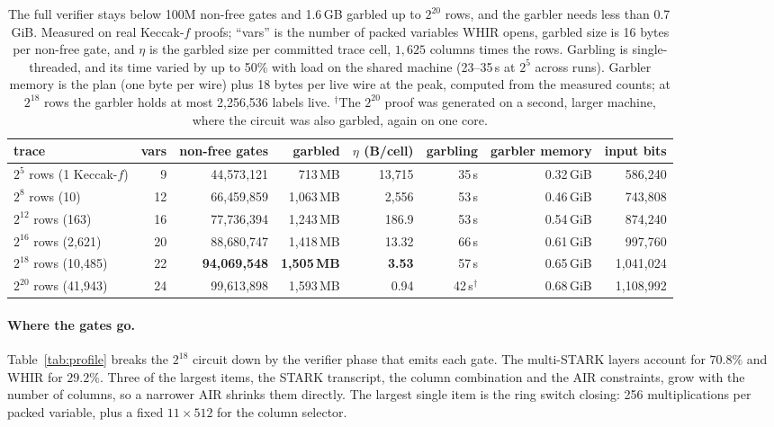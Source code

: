 \documentclass[11pt]{article}
\begin{document}
\begin{table}[t]\centering\footnotesize\setlength{\tabcolsep}{4pt}
\begin{tabular}{lrrrrrrr}\toprule
trace & vars & non-free gates & garbled & $\eta$ (B/cell) & garbling & garbler memory & input bits\\\midrule
$2^5$ rows (1 Keccak-$f$) & 9 & 44{,}573{,}121 & 713\,MB & 13{,}715 & 35\,s & 0.32\,GiB & 586{,}240\\
$2^8$ rows (10) & 12 & 66{,}459{,}859 & 1{,}063\,MB & 2{,}556 & 53\,s & 0.46\,GiB & 743{,}808\\
$2^{12}$ rows (163) & 16 & 77{,}736{,}394 & 1{,}243\,MB & 186.9 & 53\,s & 0.54\,GiB & 874{,}240\\
$2^{16}$ rows (2{,}621) & 20 & 88{,}680{,}747 & 1{,}418\,MB & 13.32 & 66\,s & 0.61\,GiB & 997{,}760\\
$2^{18}$ rows (10{,}485) & 22 & \textbf{94{,}069{,}548} & \textbf{1{,}505\,MB} & \textbf{3.53} & 57\,s & 0.65\,GiB & 1{,}041{,}024\\
$2^{20}$ rows (41{,}943) & 24 & 99{,}613{,}898 & 1{,}593\,MB & 0.94 & 42\,s$^{\dagger}$ & 0.68\,GiB & 1{,}108{,}992\\\bottomrule
\end{tabular}
\caption{The full verifier stays below 100M non-free gates and 1.6\,GB garbled up
to $2^{20}$ rows, and the garbler needs less than 0.7\,GiB. Measured on real
Keccak-$f$ proofs; ``vars'' is the number of packed variables WHIR opens,
garbled size is 16 bytes per non-free gate, and $\eta$ is the garbled size per
committed trace cell, $1{,}625$ columns times the rows. Garbling is single-threaded, and its
time varied by up to 50\% with load on the shared machine (23--35\,s at $2^5$
across runs). Garbler memory is the plan (one byte per wire) plus 18 bytes per
live wire at the peak, computed from the measured counts; at $2^{18}$ rows the
garbler holds at most 2{,}256{,}536 labels live. $^{\dagger}$The $2^{20}$ proof was
generated on a second, larger machine, where the circuit was also garbled, again
on one core.}
\label{tab:main}
\end{table}

\paragraph{Where the gates go.} Table~\ref{tab:profile} breaks the $2^{18}$
circuit down by the verifier phase that emits each gate. The multi-STARK layers
account for $70.8\%$ and WHIR for $29.2\%$. Three of the largest items, the STARK
transcript, the column combination and the AIR constraints, grow with the number
of columns, so a narrower AIR shrinks them directly. The largest single
item is the ring switch closing: 256 multiplications per packed variable, plus a
fixed $11\times512$ for the column selector.
\end{document}
